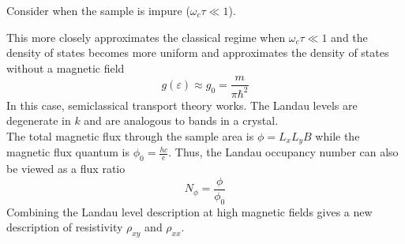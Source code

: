 \documentclass[12pt,a4paper,titlepage]{article}
\begin{document}
Consider when the sample is impure ($\omega_{c}\tau\ll1$).
\begin{center}
\end{center}
This more closely approximates the classical regime when $\omega_{c}\tau\ll1$ and the density of states becomes more uniform and approximates the density of states without a magnetic field
\begin{equation}
g(\varepsilon)\approx g_{0}=\frac{m}{\pi\hbar^{2}}
\end{equation}
In this case, semiclassical transport theory works. The Landau levels are degenerate in $k$ and are analogous to bands in a crystal.\\

The total magnetic flux through the sample area is $\phi=L_{x}L_{y}B$ while the magnetic flux quantum is $\phi_{0}=\frac{hc}{e}$. Thus, the Landau occupancy number can also be viewed as a flux ratio
\begin{equation}
N_{\phi}=\frac{\phi}{\phi_{0}}
\end{equation}
Combining the Landau level description at high magnetic fields gives a new description of resistivity $\rho_{xy}$ and $\rho_{xx}$.\\
\end{document}
